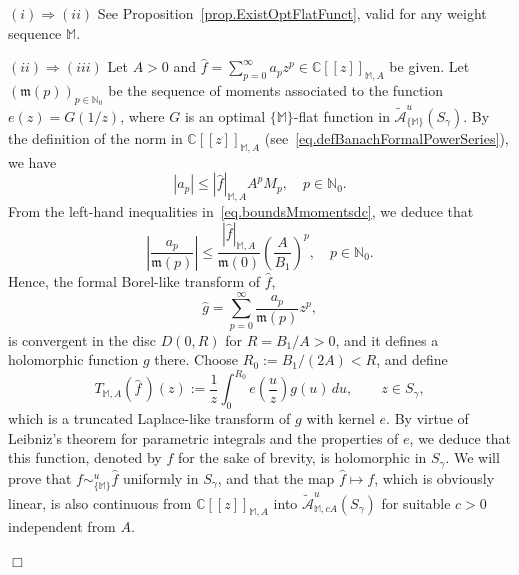 \documentclass[11pt,a4paper]{article}
\theoremstyle{plain}
\theoremstyle{definition}
\newenvironment{proof1}{\medskip\par\noindent{\bf Proof.}}{\hfill $\Box$
\medskip\par}
\newcommand{\N}{\mathbb{N}}
\newcommand{\C}{\mathbb{C}}
\newcommand{\bM}{\mathbb{M}}
\newcommand{\M}{\mathbb{M}}
\newcommand{\mo}{\mathfrak{m}}
\def\ga{\gamma}
\begin{document}
\begin{proof1}
$(i)\Rightarrow (ii)$ See Proposition~\ref{prop.ExistOptFlatFunct}, valid for any weight sequence $\M$.

$(ii)\Rightarrow (iii)$ Let $A>0$ and $\widehat{f}=\sum_{p=0}^\infty a_pz^p\in\C[[z]]_{\M,A}$ be given. Let $(\mo(p))_{p\in\N_0}$ be the sequence of moments associated to the function $e(z)=G(1/z)$, where $G$ is an optimal $\{\M\}$-flat function in $\widetilde{\mathcal{A}}^u_{\{\M\}}(S_{\ga})$.
By the definition of the norm in $\C[[z]]_{\M,A}$ (see~\eqref{eq.defBanachFormalPowerSeries}), we have
\begin{equation*}
|a_p|\le |\widehat{f}|_{\M,A}A^{p}M_p,\quad p\in\N_0.
\end{equation*}
From the left-hand inequalities in~\eqref{eq.boundsMmomentsdc}, we deduce that
\begin{equation}\label{eq.boundsCoeffBorelTransf}
\left|\frac{a_p}{\mo(p)}\right|\le \frac{|\widehat{f}|_{\M,A}}{\mo(0)}\left(\frac{A}{B_1}\right)^{p},\quad p\in\N_0.
\end{equation}
Hence, the formal Borel-like transform of $\widehat{f}$,
$$
\widehat{g}=\sum_{p=0}^\infty\frac{a_p}{\mo(p)}z^p,
$$
is convergent in the disc $D(0,R)$ for $R=B_1/A>0$, and it defines a holomorphic function $g$ there. Choose $R_0:=B_1/(2A)<R$, and define
\begin{equation*}
T_{\M,A}(\widehat{f}\,)(z):=\frac{1}{z}\int_{0}^{R_0}e\left(\frac{u}{z}\right)g(u)\,du,\qquad z\in S_{\ga},
\end{equation*}
which is a truncated Laplace-like transform of $g$ with kernel $e$.
By virtue of Leibniz's theorem for parametric integrals and the properties of $e$, we deduce that this function, denoted by $f$ for the sake of brevity, is holomorphic in $S_{\ga}$. We will prove that
$f\sim^u_{\{\bM\}}\hat{f}$ uniformly in $S_{\ga}$, and that
the map $\widehat{f}\mapsto f$, which is obviously linear, is also continuous from $\C[[z]]_{\M,A}$ into $\widetilde{\mathcal{A}}^u_{\M,cA}(S_{\ga})$ for suitable $c>0$ independent from $A$.


\end{proof1}
\end{document}
